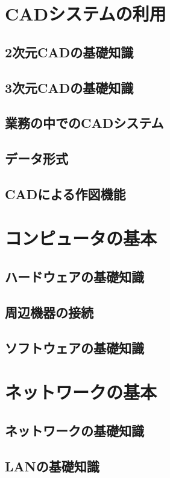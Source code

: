 \chapter{CADシステムの利用}
\section{2次元CADの基礎知識}
\section{3次元CADの基礎知識}
\section{業務の中でのCADシステム}
\section{データ形式}
\section{CADによる作図機能}




\chapter{コンピュータの基本}
\section{ハードウェアの基礎知識}
\section{周辺機器の接続}
\section{ソフトウェアの基礎知識}



\chapter{ネットワークの基本}
\section{ネットワークの基礎知識}
\section{LANの基礎知識}
